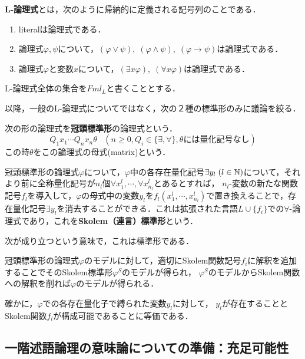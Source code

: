 \documentclass[uplatex,dvipdfmx]{jsarticle}
\begin{document}
\begin{definition}[formula]
    \textbf{L-論理式}とは，次のように帰納的に定義される記号列のことである．
    \begin{enumerate}
        \item literalは論理式である．
        \item 論理式$\varphi,\psi$について，$(\varphi\lor\psi),\;(\varphi\land\psi),\;(\varphi\to\psi)$は論理式である．
        \item 論理式$\varphi$と変数$x$について，$(\exists x\varphi),\;(\forall x\varphi)$は論理式である．
    \end{enumerate}
    L-論理式全体の集合を$Fml_L$と書くこととする．
\end{definition}

以降，一般のL-論理式についてではなく，次の２種の標準形のみに議論を絞る．

\begin{definition}
    次の形の論理式を\textbf{冠頭標準形}の論理式という．
    \[ Q_1x_1\cdots Q_nx_n\theta\;\;\;(n\ge 0,Q_i\in\{\exists,\forall\},\theta には量化記号なし) \]
    この時$\theta$をこの論理式の母式(matrix)という．
\end{definition}

\begin{definition}
    冠頭標準形の論理式$\varphi$について，$\varphi$中の各存在量化記号$\exists y_l\;(l\in\mathbb{N})$について，それより前に全称量化記号が$n_l$個$\forall x_1^l,\cdots,\forall x_{n_l}^l$とあるとすれば，
    $n_l$-変数の新たな関数記号$f_l$を導入して，$\varphi$の母式中の変数$y_l$を$f_l(x^l_1,\cdots,x^l_{n_l})$で置き換えることで，存在量化記号$\exists y_l$を消去することができる．これは拡張された言語$L\cup\{f_i\}$での$\forall$-論理式であり，これを\textbf{Skolem（連言）標準形}という．
\end{definition}
次が成り立つという意味で，これは標準形である．
\begin{proposition}\label{prop-1}
    冠頭標準形の論理式$\varphi$のモデルに対して，適切にSkolem関数記号$f_i$に解釈を追加することでそのSkolem標準形$\varphi^S$のモデルが得られ，
    $\varphi^S$のモデルからSkolem関数への解釈を削れば$\varphi$のモデルが得られる．
\end{proposition}
確かに，$\varphi$での各存在量化子で縛られた変数$y_l$に対して，
$y_l$が存在することとSkolem関数$f_l$が構成可能であることに等価である．

\subsection{一階述語論理の意味論についての準備：充足可能性}
\end{document}
